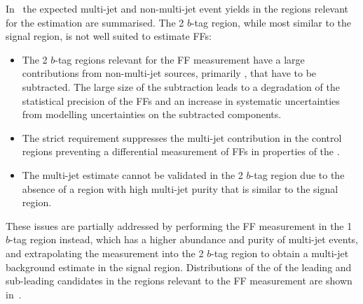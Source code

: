 In~ the expected multi-jet and non-multi-jet event
yields in the regions relevant for the \faketauhadvis estimation are
summarised. The 2 $b$-tag region, while most similar to the signal region, is
not well suited to estimate FFs:
\begin{itemize}

\item The 2 $b$-tag regions relevant for the FF measurement have a large
  contributions from non-multi-jet sources, primarily \ttbarFakes, that have to
  be subtracted. The large size of the subtraction leads to a degradation of the
  statistical precision of the FFs and an increase in systematic uncertainties
  from modelling uncertainties on the subtracted components.

\item The strict \btag requirement suppresses the multi-jet contribution in the
  control regions preventing a differential measurement of FFs in properties of
  the \tauhadvis.

\item The multi-jet estimate cannot be validated in the 2 $b$-tag region due to
  the absence of a region with high multi-jet purity that is similar to the
  signal region.

\end{itemize}
These issues are partially addressed by performing the FF measurement in the 1
$b$-tag region instead, which has a higher abundance and purity of multi-jet
events, and extrapolating the measurement into the 2 $b$-tag region to obtain a
multi-jet background estimate in the signal region. Distributions of the \pT of
the leading and sub-leading \tauhadvis candidates in the regions relevant to the
FF measurement are shown in~.

